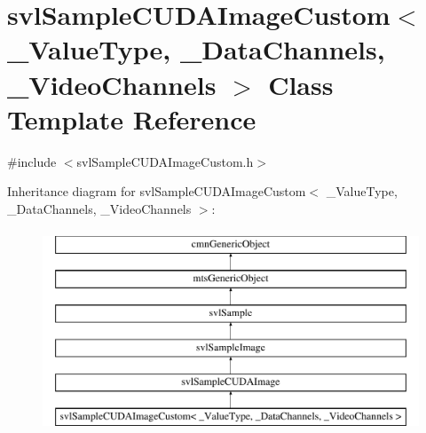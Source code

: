 \hypertarget{classsvl_sample_c_u_d_a_image_custom}{}\section{svl\+Sample\+C\+U\+D\+A\+Image\+Custom$<$ \+\_\+\+Value\+Type, \+\_\+\+Data\+Channels, \+\_\+\+Video\+Channels $>$ Class Template Reference}
\label{classsvl_sample_c_u_d_a_image_custom}


{\ttfamily \#include $<$svl\+Sample\+C\+U\+D\+A\+Image\+Custom.\+h$>$}

Inheritance diagram for svl\+Sample\+C\+U\+D\+A\+Image\+Custom$<$ \+\_\+\+Value\+Type, \+\_\+\+Data\+Channels, \+\_\+\+Video\+Channels $>$\+:\begin{figure}[H]
\begin{center}
\leavevmode
\includegraphics[height=6.000000cm]{d5/d8d/classsvl_sample_c_u_d_a_image_custom}
\end{center}
\end{figure}
